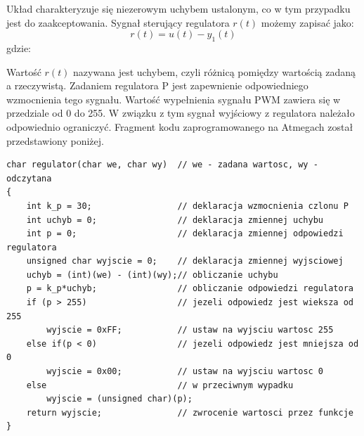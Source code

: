 Układ charakteryzuje się niezerowym uchybem ustalonym, co w tym przypadku jest do zaakceptowania. Sygnał sterujący regulatora $r(t)$ możemy zapisać jako:
\begin{equation}
	r(t)=u(t)-y_1(t)
   \label{eq:reg1}
 \end{equation}
 gdzie:  
 \begin{equationDescriptor}
 \end{equationDescriptor}
 \noindent
 Wartość $r(t)$ nazywana jest uchybem, czyli różnicą pomiędzy wartością zadaną a rzeczywistą. Zadaniem regulatora P jest zapewnienie odpowiedniego wzmocnienia tego sygnału. Wartość wypełnienia sygnału PWM zawiera się w przedziale od 0 do 255. W związku z tym sygnał wyjściowy z regulatora należało odpowiednio ograniczyć. Fragment kodu zaprogramowanego na Atmegach został przedstawiony poniżej.
\begin{lstlisting}
char regulator(char we, char wy)  // we - zadana wartosc, wy - odczytana
{
	int k_p = 30;                 // deklaracja wzmocnienia czlonu P
	int uchyb = 0;                // deklaracja zmiennej uchybu
	int p = 0;                    // deklaracja zmiennej odpowiedzi regulatora
	unsigned char wyjscie = 0;    // deklaracja zmiennej wyjsciowej
	uchyb = (int)(we) - (int)(wy);// obliczanie uchybu
	p = k_p*uchyb;                // obliczanie odpowiedzi regulatora
	if (p > 255)                  // jezeli odpowiedz jest wieksza od 255
	    wyjscie = 0xFF;           // ustaw na wyjsciu wartosc 255
	else if(p < 0)                // jezeli odpowiedz jest mniejsza od 0
	    wyjscie = 0x00;           // ustaw na wyjsciu wartosc 0
	else                          // w przeciwnym wypadku
        wyjscie = (unsigned char)(p);
	return wyjscie;               // zwrocenie wartosci przez funkcje
}
\end{lstlisting}

